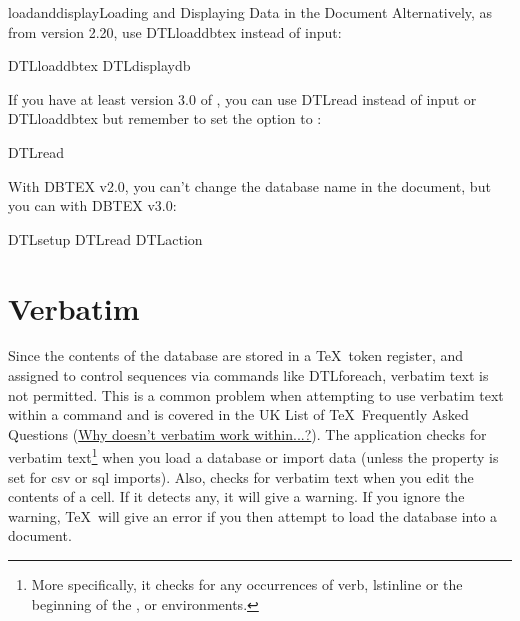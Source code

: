 \begin{example}{loadanddisplay}{Loading and Displaying Data in the
Document}
Alternatively, as from  version 2.20, use 
\gls{DTLloaddbtex} instead of \gls{input}:
\begin{codebox}
\codepar
\gls{DTLloaddbtex}
\codepar
{}
\gls{DTLdisplaydb}
\end{codebox}
If you have at least version 3.0 of , you can use
\gls{DTLread} instead of \gls{input} or \gls{DTLloaddbtex} but remember to set the
 option to :
\begin{codebox}
\gls{DTLread}
\end{codebox}
With DBTEX v2.0, you can't change the database name in the document,
but you can with DBTEX v3.0:
\begin{codebox}
\codepar
\gls{DTLsetup}
\gls{DTLread}
\codepar
{}
\gls{DTLaction}
\end{codebox}
\end{example}

\section{Verbatim}
\label{sec:verbatim}

Since the contents of the database are stored in a \TeX\ token
register, and assigned to control sequences via commands like
\gls{DTLforeach}, verbatim text is not permitted. This is 
a common problem when attempting to use verbatim text within
a command and is covered in the UK List of \TeX\ Frequently
Asked Questions (\href{https://texfaq.org/FAQ-verbwithin}{Why doesn't verbatim work within...?}).
The  application checks for verbatim text\footnote{More
specifically, it checks for any occurrences of \gls{verb}, 
\gls{lstinline} or the beginning of the ,
 or  environments.} when you load a database or import
data (unless the  property is set for
\gls{csv} or \gls{sql} imports). Also,  checks for
verbatim text when you edit the contents of a cell. If it
detects any, it will give a warning. If you ignore the warning, 
\TeX\ will give an error if you then attempt to load the database into
a document.

